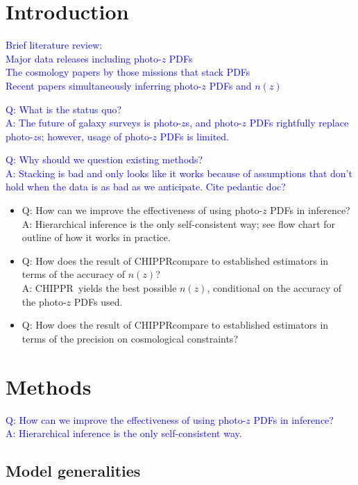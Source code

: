 \documentclass[iop]{emulateapj}
\newcommand{\chippr}{CHIPPR}
\newcommand{\nz}{$n(z)$}
\newcommand{\pz}{photo-$z$}
\newcommand{\pzpdf}{photo-$z$ PDF}
\newcommand{\aim}[1]{\textcolor{blue}{#1}}
\begin{document}
\section{Introduction}
\label{sec:introduction}

\aim{Brief literature review:\\
Major data releases including \pzpdf s\\
The cosmology papers by those missions that stack PDFs\\
Recent papers simultaneously inferring \pzpdf s and \nz}

\aim{Q: What is the status quo?\\
A: The future of galaxy surveys is \pz s, and \pzpdf s rightfully replace \pz s; however, usage of \pzpdf s is limited.}

\aim{Q: Why should we question existing methods?\\
A: Stacking is bad and only looks like it works because of assumptions that don't hold when the data is as bad as we anticipate.  Cite pedantic doc?}


\begin{itemize}
	\item
	Q: How can we improve the effectiveness of using \pzpdf s in inference?\\
	A: Hierarchical inference is the only self-consistent way; see flow chart for outline of how it works in practice.
	\item
	Q: How does the result of \chippr compare to established estimators in terms of the accuracy of \nz ?\\
	A: \chippr\ yields the best possible \nz , conditional on the accuracy of the \pzpdf s used.
	\item
	Q: How does the result of \chippr compare to established estimators in terms of the precision on cosmological constraints?
\end{itemize}

\section{Methods}
\label{sec:methods}

\textcolor{blue}{Q: How can we improve the effectiveness of using \pzpdf s in inference?\\
A: Hierarchical inference is the only self-consistent way.}

\subsection{Model generalities}
\label{sec:model}
\end{document}
